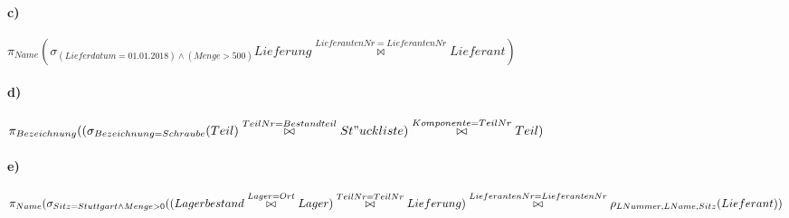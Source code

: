 \documentclass[12pt]{article}
\begin{document}
 	
 	\paragraph*{c)}
 	$\pi_{Name}(\sigma_{(Lieferdatum = 01.01.2018) \wedge (Menge > 500)}Lieferung \overset{LieferantenNr = LieferantenNr}{\bowtie} Lieferant)$
 	
 	
 	\paragraph*{d)}
 	$\pi_{Bezeichnung}(\large(\sigma_{Bezeichnung=Schraube}(Teil) \overset{TeilNr = Bestandteil}{\bowtie} St"uckliste\large) \overset{Komponente = TeilNr}{\bowtie} Teil)$
 	
 	\paragraph*{e)}
 	$\pi_{Name}( \sigma_{Sitz = Stuttgart \wedge Menge > 0}((Lagerbestand \overset{Lager = Ort}{\bowtie} Lager) \overset{TeilNr = TeilNr}{\bowtie} Lieferung)\\ \overset{LieferantenNr = LieferantenNr}{\bowtie} \rho_{LNummer,LName,Sitz}(Lieferant))$
 
\end{document}
